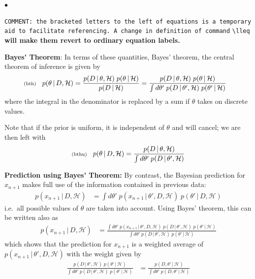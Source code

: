 \documentclass[11pt]{article}
\newcommand{\lleq}[1]{\label{#1} }
\renewcommand{\lleq}[1]{\label{#1} {\scriptstyle {\rm (#1)}} \hspace*{2ex} }
\newenvironment{mtemize}{
  \begin{list}{$\bullet$}
    {\setlength{\itemsep}{0pt}
     \setlength{\leftmargin}{3ex}
    }
  }
  {\end{list}}
\newcommand{\hmod}  {{\mathcal{H}}}  %
\newcommand{\cond}{\,|\,}
\begin{document}
\begin{mtemize}
\item \texttt{COMMENT: the bracketed letters to the left of equations
    is a temporary aid to facilitate referencing. A change in
    definition of command} \verb=\lleq= \textbf{will make them revert
    to ordinary equation labels.}

\item \textbf{Bayes' Theorem}: In terms of these quantities, Bayes'
  theorem, the central theorem of inference is given by
  \begin{align}
    \lleq{bth}
    p(\theta\cond D,\hmod)
    &= \frac{p(D\cond\theta,\hmod)\;p(\theta\cond\hmod)}
    {p(D\cond\hmod)}
    = \frac{p(D\cond\theta,\hmod)\;p(\theta\cond\hmod)}
    {\int d\theta'\; p(D\cond\theta',\hmod)\;p(\theta'\cond\hmod)}
  \end{align}
  where the integral in the denominator is replaced by a sum if
  $\theta$ takes on discrete values.

\item Note that if the prior is uniform, it is independent of $\theta$
  and will cancel; we are then left with
  \begin{equation}
    \lleq{bthu}
    p(\theta\cond D,\hmod)
    = \frac{p(D\cond\theta,\hmod)} {\int d\theta'\; p(D\cond\theta',\hmod)}
  \end{equation}

\item \textbf{Prediction using Bayes' Theorem:} By contrast, the
  Bayesian prediction for $x_{n+1}$ makes full use of the information
  contained in previous data:
  \begin{align}
    p(x_{n+1}\cond D,\hmod)
    &= \int d\theta'\; p(x_{n+1}\cond\theta',D,\hmod)\;p(\theta'\cond
    D,\hmod)
  \end{align}
  i.e.\ all possible values of $\theta$ are taken into account. Using
  Bayes' theorem, this can be written also as
  \begin{align}
    p(x_{n+1}\cond D,\hmod)
    &= \frac{\int d\theta'\; p(x_{n+1}\cond\theta',D,\hmod)\;
      p(D\cond\theta',\hmod)\;p(\theta'\cond\hmod)}
    {\int d\theta'\; p(D\cond\theta',\hmod)\;p(\theta'\cond\hmod)}
  \end{align}
  which shows that the prediction for $x_{n+1}$ is a weighted average
  of $p(x_{n+1}\cond\theta',D,\hmod)$ with the weight given by
  \begin{align}
  \frac{p(D\cond\theta',\hmod)\;p(\theta'\cond\hmod)}
  {\int d\theta'\; p(D\cond\theta',\hmod)\;p(\theta'\cond\hmod)}
  &=
  \frac{p(D,\theta'\cond\hmod)}
  {\int d\theta'\; p(D,\theta'\cond\hmod)}
  \end{align}
\end{mtemize}
\end{document}
